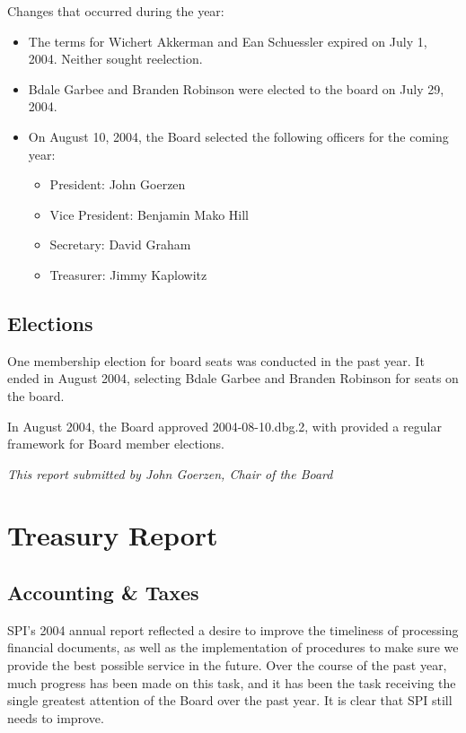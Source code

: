 \documentclass[letterpaper]{report}
\begin{document}
Changes that occurred during the year:

\begin{itemize}

\item The terms for Wichert Akkerman and Ean Schuessler expired on July 1, 2004. Neither sought reelection.
\item Bdale Garbee and Branden Robinson were elected to the board on July 29, 2004.
\item On August 10, 2004, the Board selected the following officers for the coming year:

	\begin{itemize}

	\item President: John Goerzen
	\item Vice President: Benjamin Mako Hill
	\item Secretary: David Graham
	\item Treasurer: Jimmy Kaplowitz

	\end{itemize}

\end{itemize}

\section{Elections}

One membership election for board seats was conducted in the past year. It
ended in August 2004, selecting Bdale Garbee and Branden Robinson for seats
on the board.

In August 2004, the Board approved 2004-08-10.dbg.2, with provided a
regular framework for Board member elections.

\emph{This report submitted by John Goerzen, Chair of the Board}


\chapter{Treasury Report}

\section{Accounting \& Taxes}

SPI's 2004 annual report reflected a desire to improve the timeliness of
processing financial documents, as well as the implementation of procedures
to make sure we provide the best possible service in the future.  Over the
course of the past year, much progress has been made on this task, and it
has been the task receiving the single greatest attention of the Board over
the past year.  It is clear that SPI still needs to improve.
\end{document}
